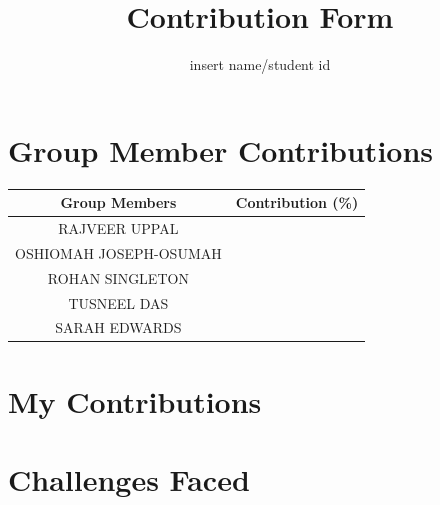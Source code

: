 \documentclass{article}
\title{Contribution Form}
\author{insert name/student id}
\date{}
\begin{document}
\maketitle

\section{Group Member Contributions}
\begin{tabular}{|c | c |} 
 \hline
 Group Members & Contribution (\%) \\ [0.5ex] 
 \hline\hline
RAJVEER UPPAL &  \\ 
 \hline
 OSHIOMAH JOSEPH-OSUMAH &   \\
 \hline
  ROHAN SINGLETON &  \\ 
 \hline
 TUSNEEL DAS &   \\
  \hline
 SARAH EDWARDS &   \\
 \hline
\end{tabular}


\section{My Contributions}

\section{Challenges Faced}
\end{document}
